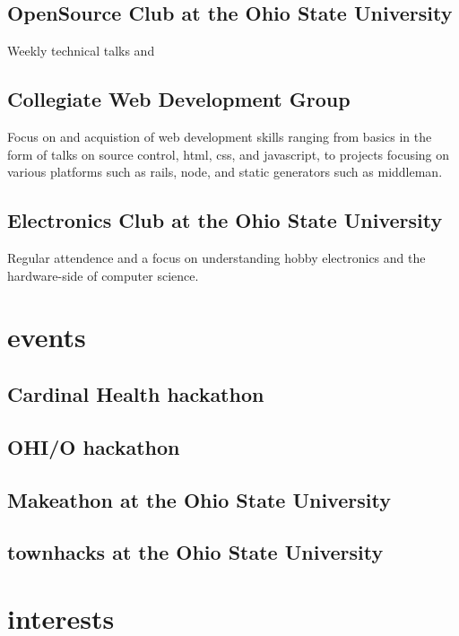 \documentclass[12pt,letterpaper]{cv}
\begin{document}
		\subsection{OpenSource Club at the Ohio State University}
			Weekly technical talks and 

		\subsection{Collegiate Web Development Group}
			Focus on and acquistion of web development skills ranging from basics in the form of talks on source control, html, css, and javascript, to projects focusing on various platforms such as rails, node, and static generators such as middleman.

		\subsection{Electronics Club at the Ohio State University}
			Regular attendence and a focus on understanding hobby electronics and the hardware-side of computer science.

	\section{events}
		\subsection{Cardinal Health hackathon}
			

		\subsection{OHI/O hackathon}
			

		\subsection{Makeathon at the Ohio State University}
			

		\subsection{townhacks at the Ohio State University}
			

	\section{interests}
		
		
\end{document}
